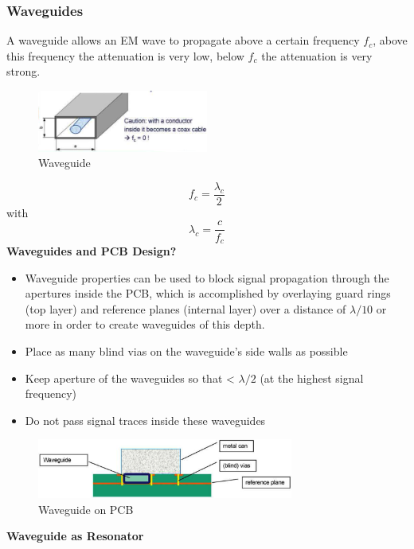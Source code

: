 		\subsubsection{Waveguides}
		A waveguide allows an EM wave to propagate above a certain frequency $f_c$, above this frequency the attenuation is very low, below $f_c$ the attenuation is very strong. 
		\begin{figure}[h]
			\centering
			\includegraphics[width=0.5\textwidth]{images/Waveguide.png}
			\caption{Waveguide}
			\label{Fig:Waveguide}
		\end{figure}
		\begin{equation}
			f_c = \frac{\lambda_c}{2}
		\end{equation}
		with 
		\begin{equation}
			\lambda_c = \frac{c}{f_c}
		\end{equation}
		\textbf{Waveguides and PCB Design?} 
		\begin{itemize}
			\item Waveguide properties can be used to block signal propagation through the apertures inside the PCB, which is accomplished by overlaying guard rings (top layer) and reference planes (internal layer) over a distance of $\lambda/10$ or more in order to create waveguides of this depth. 
			\item Place as many blind vias on the waveguide's side walls as possible
			\item Keep aperture of the waveguides so that < $\lambda/2$ (at the highest signal frequency)
			\item Do not pass signal traces inside these waveguides
		\end{itemize}
		\begin{figure}[h]
			\centering
			\includegraphics[width=0.75\textwidth]{images/PCBWaveguides.png}
			\caption{Waveguide on PCB}
			\label{Fig:PCBWaveguide}
		\end{figure}
		\textbf{Waveguide as Resonator} \\
